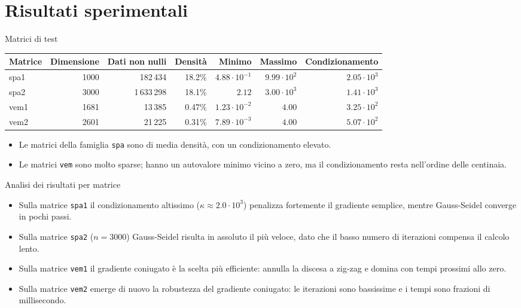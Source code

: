 \documentclass[11pt,aspectratio=169,xcolor=dvipsnames]{beamer}
\begin{document}
\section{Risultati sperimentali}

\begin{frame}{Matrici di test}
    \begin{table}
        \centering
        \small
        \begin{tabular}{lrrrrrr}
        \toprule
        Matrice & Dimensione & Dati non nulli & Densità & Minimo & Massimo & Condizionamento \\
        \midrule
        spa1 & 1000 & 182\,434 & 18.2\% & $4.88\cdot10^{-1}$ & $9.99\cdot10^{2}$ & $2.05\cdot10^{3}$ \\
        spa2 & 3000 & 1\,633\,298 & 18.1\% & $2.12$ & $3.00\cdot10^{3}$ & $1.41\cdot10^{3}$ \\
        vem1 & 1681 & 13\,385 & 0.47\% & $1.23\cdot10^{-2}$ & $4.00$ & $3.25\cdot10^{2}$ \\
        vem2 & 2601 & 21\,225 & 0.31\% & $7.89\cdot10^{-3}$ & $4.00$ & $5.07\cdot10^{2}$ \\
        \bottomrule
        \end{tabular}
    \end{table}
    \begin{itemize}
        \item Le matrici della famiglia \texttt{spa} sono di media densità, con un condizionamento elevato.
        \item Le matrici \texttt{vem} sono molto sparse; hanno un autovalore minimo vicino a zero, ma il condizionamento resta nell'ordine delle centinaia.
    \end{itemize}
\end{frame}

\begin{frame}{Analisi dei risultati per matrice}
    \begin{itemize}
        \item Sulla matrice \texttt{spa1} il condizionamento altissimo ($\kappa\approx2.0\cdot10^3$) penalizza fortemente il gradiente semplice, mentre Gauss-Seidel converge in pochi passi.
        \item Sulla matrice \texttt{spa2} ($n=3000$) Gauss-Seidel risulta in assoluto il più veloce, dato che il basso numero di iterazioni compensa il calcolo lento.
        \item Sulla matrice \texttt{vem1} il gradiente coniugato è la scelta più efficiente: annulla la discesa a zig-zag e domina con tempi prossimi allo zero.
        \item Sulla matrice \texttt{vem2} emerge di nuovo la robustezza del gradiente coniugato: le iterazioni sono bassissime e i tempi sono frazioni di millisecondo.
    \end{itemize}
\end{frame}
\end{document}
